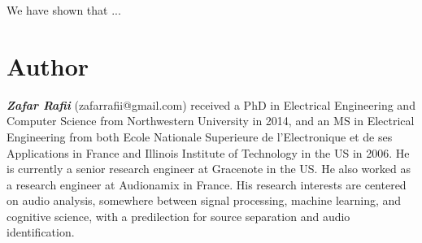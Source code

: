 \documentclass[journal]{IEEEtran}
\begin{document}
We have shown that ...



\section{Author}

\textit{\textbf{Zafar Rafii}} (zafarrafii@gmail.com) received a PhD in Electrical Engineering and Computer Science from Northwestern University in 2014, and an MS in Electrical Engineering from both Ecole Nationale Superieure de l’Electronique et de ses Applications in France and Illinois Institute of Technology in the US in 2006. He is currently a senior research engineer at Gracenote in the US. He also worked as a research engineer at Audionamix in France. His research interests are centered on audio analysis, somewhere between signal processing, machine learning, and cognitive science, with a predilection for source separation and audio identification.



\end{document}
